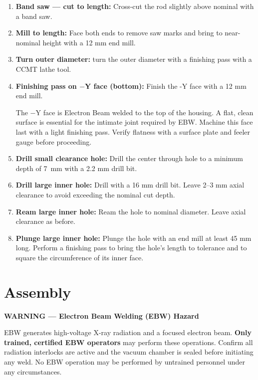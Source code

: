 \documentclass[12pt, letterpaper]{report}%
\begin{document}
\begin{appendices}
	\begin{enumerate}[itemsep=4pt]
		\item \textbf{Band saw --- cut to length:} Cross-cut the rod slightly above
					nominal with a band saw.
		\item \textbf{Mill to length:} Face both ends to remove saw marks and bring to
					near-nominal height with a 12 mm end mill.
		\item \textbf{Turn outer diameter:} turn the outer diameter with a finishing pass with a CCMT lathe tool.
		\item \textbf{Finishing pass on $-$Y face (bottom):} Finish the -Y face with a 12 mm end mill.
					\begin{notebox}
					The $-$Y face is Electron Beam welded to the top of the housing. A flat,
					clean surface is essential for the intimate joint
					required by EBW. Machine this face last with a
					light finishing pass. Verify flatness with a surface plate and feeler gauge
					before proceeding.
					\end{notebox}
		\item \textbf{Drill small clearance hole:} Drill
					the center through hole to a minimum depth of \SI{7}{\milli\meter}
					with a 2.2 mm drill bit.
		\item \textbf{Drill large inner hole:}
					Drill with a 16 mm drill bit. Leave 2--3 mm axial clearance to avoid exceeding the nominal cut depth.
		\item \textbf{Ream large inner hole:}
					Ream the hole to nominal diameter. Leave axial clearance as before.
		\item \textbf{Plunge large inner hole:}
					Plunge the hole with an end mill at least 45 mm long.
					Perform a finishing pass to bring the
					hole's length to tolerance and to square the circumference of its inner face.
	\end{enumerate}

	\section{Assembly}
	\label{sec:assy}

	\begin{warningbox}
	\textbf{\textcolor{warnred}{WARNING --- Electron Beam Welding (EBW) Hazard}}

	EBW generates high-voltage X-ray radiation and a focused electron beam.
	\textbf{Only trained, certified EBW operators} may perform these operations.
	Confirm all radiation interlocks are active and the vacuum chamber is sealed
	before initiating any weld. No EBW operation may be performed by untrained
	personnel under any circumstances.
	\end{warningbox}


\end{appendices}
\end{document}
